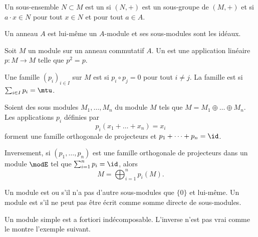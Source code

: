 \begin{definition}
  Un sous-ensemble \( N\subset M\) est un  si \( (N,+)\) est un sous-groupe de \( (M,+)\) et si \( a\cdot x\in N\) pour tout \( x\in N\) et pour tout \( a\in A\).
\end{definition}

\begin{example}
    Un anneau \( A\) est lui-même un \( A\)-module et ses sous-modules sont les idéaux.
\end{example}

\begin{definition}
    Soit \( M\) un module sur un anneau commutatif \( A\). Un  est une application linéaire \( p\colon M\to M\) telle que \( p^2=p\).

    Une famille \( (p_i)_{i\in I}\) sur \( M\) est  si \( p_i\circ p_j=0\) pour tout \( i\neq j\). La famille est  si \( \sum_{i\in I}p_i=\mtu\).
\end{definition}

\begin{theorem}     \label{ThoProjModpAlsUR}
    Soient des sous modules \( M_1,\ldots,M_n\) du module \( M \) tels que \( M=M_1\oplus\ldots\oplus M_n\). Les applications \( p_i\) définies par
    \begin{equation}
        p_i(x_1+\ldots+x_n)=x_i
    \end{equation}
    forment une famille orthogonale de projecteurs et \( p_1+\cdots +p_n=\id\).

    Inversement, si \( (p_1,\ldots, p_n)\) est une famille orthogonale de projecteurs dans un module \( \modE\) tel que \( \sum_{i=1}^np_i=\id\), alors
    \begin{equation}
        M=\bigoplus_{i=1}^np_i(M).
    \end{equation}
\end{theorem}

Un module est  ou  s'il n'a pas d'autre sous-modules que \( \{ 0 \}\) et lui-même. Un module est  s'il ne peut pas être écrit comme somme directe de sous-modules.

Un module simple est a fortiori indécomposable. L'inverse n'est pas vrai comme le montre l'exemple suivant.

